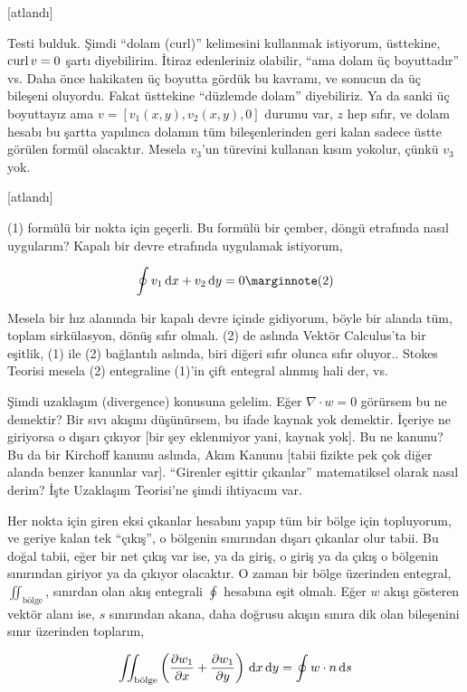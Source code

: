 \documentclass[12pt,fleqn]{article}\usepackage{../../common}
\begin{document}
[atlandı]

Testi bulduk. Şimdi ``dolam (curl)'' kelimesini kullanmak istiyorum, üsttekine,
$\operatorname{curl} v = 0$ şartı diyebilirim. İtiraz edenleriniz olabilir, ``ama dolam üç
boyuttadır'' vs. Daha önce hakikaten üç boyutta gördük bu kavramı, ve sonucun da
üç bileşeni oluyordu. Fakat üsttekine ``düzlemde dolam'' diyebiliriz.  Ya da
sanki üç boyuttayız ama $v = [v_1(x,y), v_2(x,y), 0]$ durumu var, $z$ hep sıfır,
ve dolam hesabı bu şartta yapılınca dolamın tüm bileşenlerinden geri kalan
sadece üstte görülen formül olacaktır. Mesela $v_3$'un türevini kullanan kısım
yokolur, çünkü $v_3$ yok.

[atlandı]

(1) formülü bir nokta için geçerli. Bu formülü bir çember, döngü etrafında
nasıl uygularım? Kapalı bir devre etrafında uygulamak istiyorum,

$$
\oint v_1 \ud x + v_2 \ud y = 0
\mlabel{2}
$$
 
Mesela bir hız alanında bir kapalı devre içinde gidiyorum, böyle bir alanda tüm,
toplam sirkülasyon, dönüş sıfır olmalı. (2) de aslında Vektör Calculus'ta bir
eşitlik, (1) ile (2) bağlantılı aslında, biri diğeri sıfır olunca sıfır oluyor..
Stokes Teorisi mesela (2) entegraline (1)'in çift entegral alınmış hali der, vs.

Şimdi uzaklaşım (divergence) konusuna gelelim. Eğer $\nabla \cdot w = 0$
görürsem bu ne demektir? Bir sıvı akışını düşünürsem, bu ifade kaynak yok
demektir. İçeriye ne giriyorsa o dışarı çıkıyor [bir şey eklenmiyor yani, kaynak
yok]. Bu ne kanunu? Bu da bir Kirchoff kanunu aslında, Akım Kanunu [tabii
fizikte pek çok diğer alanda benzer kanunlar var]. ``Girenler eşittir çıkanlar''
matematiksel olarak nasıl derim? İşte Uzaklaşım Teorisi'ne şimdi ihtiyacım var.

Her nokta için giren eksi çıkanlar hesabını yapıp tüm bir bölge için topluyorum,
ve geriye kalan tek ``çıkış'', o bölgenin sınırından dışarı çıkanlar olur tabii.
Bu doğal tabii, eğer bir net çıkış var ise, ya da giriş, o giriş ya da çıkış o
bölgenin sınırından giriyor ya da çıkıyor olacaktır. O zaman bir bölge üzerinden
entegral, $\iint_{\textrm{bölge}}$, sınırdan olan akış entegrali $\oint$
hesabına eşit olmalı. Eğer $w$ akışı gösteren vektör alanı ise, $s$ sınırından
akana, daha doğrusu akışın sınıra dik olan bileşenini sınır üzerinden toplarım,

$$
\iint_{\textrm{bölge}} \left( 
\frac{\partial w_1}{\partial x} +
\frac{\partial w_1}{\partial y}   \right)
\,\mathrm{d} x \,\mathrm{d} y =
\oint w \cdot n \,\mathrm{d} s
$$
\end{document}
